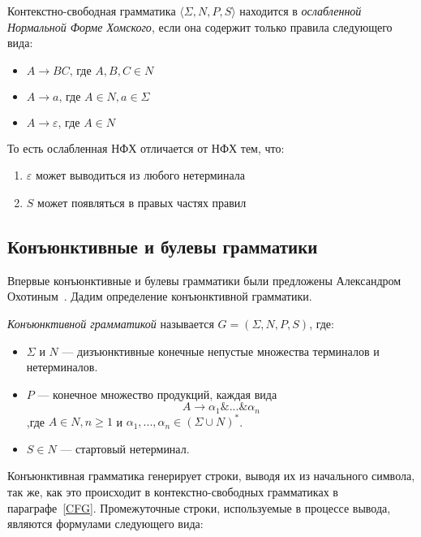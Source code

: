\begin{definition}
Контекстно-свободная грамматика $\langle \Sigma, N, P, S\rangle$ находится в \textit{ослабленной Нормальной Форме Хомского}, если она содержит только правила следующего вида:

\begin{itemize}
  \item $A \to B C \text{, где } A, B, C \in N$
  \item $A \to a \text{, где } A \in N, a \in \Sigma$
  \item $A \to \varepsilon \text{, где } A \in N$
\end{itemize}

То есть ослабленная НФХ отличается от НФХ тем, что:
\begin{enumerate}
  \item $\varepsilon$ может выводиться из любого нетерминала
  \item $S$ может появляться в правых частях правил
\end{enumerate}
\end{definition}

\subsection{Конъюнктивные и булевы грамматики}

Впервые конъюнктивные и булевы грамматики были предложены Александром Охотиным~\cite{DBLP:journals/jalc/Okhotin01,Okhotin:2003:BG:1758089.1758123}. Дадим определение конъюнктивной грамматики.

\begin{definition}
    \textit{Конъюнктивной грамматикой} называется $G = (\Sigma,N,P,S)$, где:
    \begin{itemize}
        \item $\Sigma$ и $N$ --- дизъюнктивные конечные непустые множества терминалов и нетерминалов.
        \item $P$ --- конечное множество продукций, каждая вида
        \[
        A\rightarrow \alpha_1\&...\&\alpha_n
        \]
        ,где $A \in N,n \geq 1$ и $\alpha_1,...,\alpha_n \in (\Sigma \cup N)^*$.
        \item $S \in N$  --- стартовый нетерминал.
    \end{itemize}
\end{definition}

Конъюнктивная грамматика генерирует строки, выводя их из начального символа, так же, как это происходит в контекстно-свободных грамматиках в параграфе~\ref{CFG}. Промежуточные строки, используемые в процессе вывода, являются формулами следующего вида:

